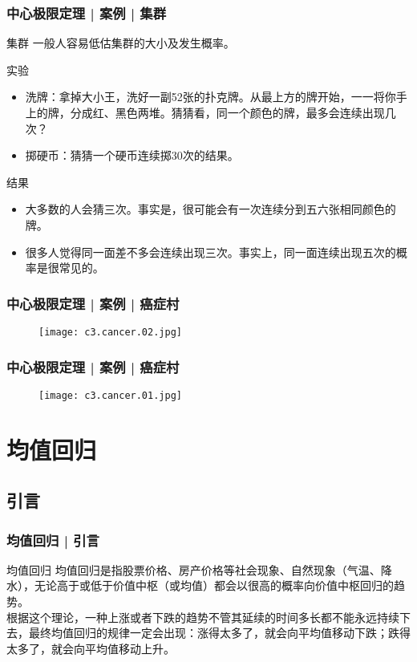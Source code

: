 \begin{frame}
  \frametitle{中心极限定理 | 案例 | 集群}
  \begin{block}{集群}
    一般人容易低估集群的大小及发生概率。
  \end{block}
  \pause
  \begin{block}{实验}
    \begin{itemize}
      \item 洗牌：拿掉大小王，洗好一副52张的扑克牌。从最上方的牌开始，一一将你手上的牌，分成红、黑色两堆。猜猜看，同一个颜色的牌，最多会连续出现几次？
      \item 掷硬币：猜猜一个硬币连续掷30次的结果。
    \end{itemize}
  \end{block}
  \pause
  \begin{block}{结果}
    \begin{itemize}
      \item 大多数的人会猜三次。事实是，很可能会有一次连续分到五六张相同颜色的牌。
      \item 很多人觉得同一面差不多会连续出现三次。事实上，同一面连续出现五次的概率是很常见的。
    \end{itemize}
  \end{block}
\end{frame}

\begin{frame}
  \frametitle{中心极限定理 | 案例 | 癌症村}
  \begin{figure}
    \centering
    \texttt{[image: c3.cancer.02.jpg]}
  \end{figure}
\end{frame}

\begin{frame}
  \frametitle{中心极限定理 | 案例 | 癌症村}
  \begin{figure}
    \centering
    \texttt{[image: c3.cancer.01.jpg]}
  \end{figure}
\end{frame}

\section{均值回归}
\subsection{引言}
\begin{frame}
  \frametitle{均值回归 | 引言}
  \begin{block}{均值回归}
    均值回归是指股票价格、房产价格等社会现象、自然现象（气温、降水），无论高于或低于价值中枢（或均值）都会以很高的概率向价值中枢回归的趋势。\\
    \vspace{1em}
根据这个理论，一种上涨或者下跌的趋势不管其延续的时间多长都不能永远持续下去，最终均值回归的规律一定会出现：涨得太多了，就会向平均值移动下跌；跌得太多了，就会向平均值移动上升。
  \end{block}
\end{frame}


